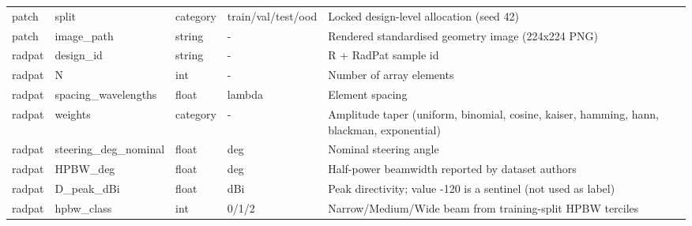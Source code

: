 \documentclass[11pt,a4paper]{article}
\begin{document}
\begin{table}[H]
\begin{tabularx}{\linewidth}{XXXXX}
patch & split & category & train/val/test/ood & Locked design-level allocation (seed 42) \\
patch & image\_path & string & - & Rendered standardised geometry image (224x224 PNG) \\
radpat & design\_id & string & - & R + RadPat sample id \\
radpat & N & int & - & Number of array elements \\
radpat & spacing\_wavelengths & float & lambda & Element spacing \\
radpat & weights & category & - & Amplitude taper (uniform, binomial, cosine, kaiser, hamming, hann, blackman, exponential) \\
radpat & steering\_deg\_nominal & float & deg & Nominal steering angle \\
radpat & HPBW\_deg & float & deg & Half-power beamwidth reported by dataset authors \\
radpat & D\_peak\_dBi & float & dBi & Peak directivity; value -120 is a sentinel (not used as label) \\
radpat & hpbw\_class & int & 0/1/2 & Narrow/Medium/Wide beam from training-split HPBW terciles \\
\bottomrule
\end{tabularx}
\end{table}
\end{document}
